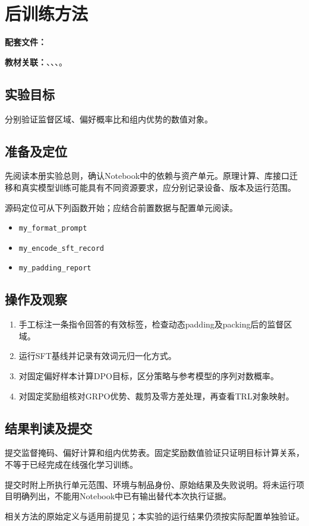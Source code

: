 \chapter{后训练方法}
\label{lab:41_post_training}

\noindent\textbf{配套文件：}\par
\noindent\textbf{教材关联：}、、、。

\section*{实验目标}
分别验证监督区域、偏好概率比和组内优势的数值对象。

\section*{准备及定位}
先阅读本册实验总则，确认Notebook中的依赖与资产单元。原理计算、库接口迁移和真实模型训练可能具有不同资源要求，应分别记录设备、版本及运行范围。

源码定位可从下列函数开始；应结合前置数据与配置单元阅读。
\begin{itemize}
\item \texttt{my\_format\_prompt}
\item \texttt{my\_encode\_sft\_record}
\item \texttt{my\_padding\_report}
\end{itemize}

\section*{操作及观察}
\begin{enumerate}
\item 手工标注一条指令回答的有效标签，检查动态padding及packing后的监督区域。
\item 运行SFT基线并记录有效词元归一化方式。
\item 对固定偏好样本计算DPO目标，区分策略与参考模型的序列对数概率。
\item 对固定奖励组核对GRPO优势、裁剪及零方差处理，再查看TRL对象映射。
\end{enumerate}

\section*{结果判读及提交}
提交监督掩码、偏好计算和组内优势表。固定奖励数值验证只证明目标计算关系，不等于已经完成在线强化学习训练。

提交时附上所执行单元范围、环境与制品身份、原始结果及失败说明。将未运行项目明确列出，不能用Notebook中已有输出替代本次执行证据。

相关方法的原始定义与适用前提见\cite{rafailov2023dpo,shao2024deepseekmath}；本实验的运行结果仍须按实际配置单独验证。
